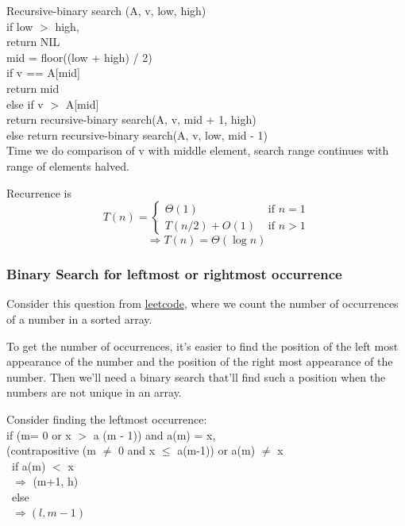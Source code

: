 \documentclass[10pt]{amsart}
\begin{document}
\begin{multicols*}{2}
Recursive-binary search (A, v, low, high) \\
\quad if low $>$ high, \\
\quad \quad return NIL \\
\quad mid  = floor((low + high) / 2) \\
\quad if v == A[mid] \\
\quad \quad return mid \\
\quad else if v $>$ A[mid] \\
\quad \quad return recursive-binary search(A, v, mid + 1, high) \\
\quad else return recursive-binary search(A, v, low, mid - 1) \\

Time we do comparison of v with middle element, search range continues with range of elements halved.

Recurrence is 
\[
T(n) = \begin{cases} \Theta(1) & \text{ if } n = 1 \\
	T(n/2) + O(1) & \text{ if } n > 1 \end{cases}
\]
\[
\Longrightarrow T(n) = \Theta(\log{n})
\]

\subsubsection{Binary Search for leftmost or rightmost occurrence}

Consider this question from \href{https://leetcode.com/discuss/interview-question/algorithms/124724/facebook-onsite-count-occurrences-of-a-number-in-a-sorted-array}{leetcode}, where we count the number of occurrences of a number in a sorted array.

To get the number of occurrences, it's easier to find the position of the left most appearance of the number and the position of the right most appearance of the number. Then we'll need a binary search that'll find such a position when the numbers are not unique in an array.

Consider finding the leftmost occurrence: \\
if (m= 0 or x $>$ a (m - 1)) and a(m) = x, \\
(contrapositive (m $\neq$ 0 and x $\leq $ a(m-1)) or a(m) $\neq$ x \\
\quad \, if a(m) $<$ x \\
\quad \, $\Longrightarrow $ (m+1, h) \\
\quad \, else \\
\quad \, $\Longrightarrow (l, m - 1)$ \\


\end{multicols*}
\end{document}
